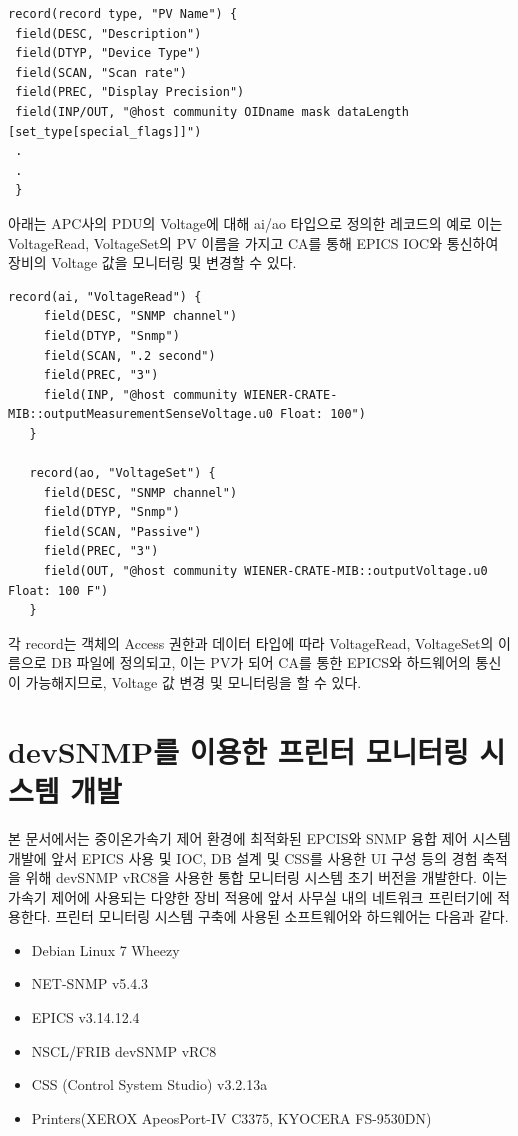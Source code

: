 \documentclass[11pt
  , a4paper
  , article
  , oneside
]{memoir}
\begin{document}
\begin{lstlisting}[style=termstyle]
record(record type, "PV Name") {
 field(DESC, "Description")
 field(DTYP, "Device Type")
 field(SCAN, "Scan rate")
 field(PREC, "Display Precision")
 field(INP/OUT, "@host community OIDname mask dataLength [set_type[special_flags]]")
 .
 .
 }
\end{lstlisting}

아래는 APC사의 PDU의 Voltage에 대해 ai/ao 타입으로 정의한 레코드의 예로 이는 VoltageRead, VoltageSet의 PV 이름을 가지고 CA를 통해 EPICS IOC와 통신하여 장비의 Voltage 값을 모니터링 및 변경할 수 있다.

\begin{lstlisting}[style=termstyle]
   record(ai, "VoltageRead") {
     field(DESC, "SNMP channel")
     field(DTYP, "Snmp")
     field(SCAN, ".2 second")
     field(PREC, "3")
     field(INP, "@host community WIENER-CRATE-MIB::outputMeasurementSenseVoltage.u0 Float: 100")
   }

   record(ao, "VoltageSet") {
     field(DESC, "SNMP channel")
     field(DTYP, "Snmp")
     field(SCAN, "Passive")
     field(PREC, "3")
     field(OUT, "@host community WIENER-CRATE-MIB::outputVoltage.u0 Float: 100 F")
   }
\end{lstlisting}

각 record는 객체의 Access 권한과 데이터 타입에 따라 VoltageRead, VoltageSet의 이름으로 DB 파일에 정의되고, 이는 PV가 되어 CA를 통한 EPICS와 하드웨어의 통신이 가능해지므로, Voltage 값 변경 및 모니터링을 할 수 있다.

\section{devSNMP를 이용한 프린터 모니터링 시스템 개발}
본 문서에서는 중이온가속기 제어 환경에 최적화된 EPCIS와 SNMP 융합 제어 시스템 개발에 앞서 EPICS 사용 및 IOC, DB 설계 및 CSS를 사용한 UI 구성 등의 경험 축적을 위해 devSNMP vRC8을 사용한 통합 모니터링 시스템 초기 버전을 개발한다. 이는 가속기 제어에 사용되는 다양한 장비 적용에 앞서 사무실 내의 네트워크 프린터기에 적용한다. 프린터 모니터링 시스템 구축에 사용된 소프트웨어와 하드웨어는 다음과 같다.

\begin{itemize}
\item Debian Linux 7 Wheezy
\item NET-SNMP v5.4.3
\item EPICS v3.14.12.4
\item NSCL/FRIB devSNMP vRC8
\item CSS (Control System Studio) v3.2.13a
\item Printers(XEROX ApeosPort-IV C3375, KYOCERA FS-9530DN)
\end{itemize}
\end{document}
